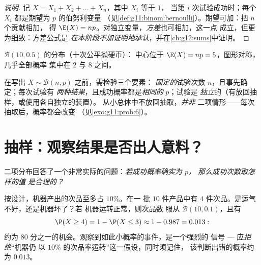 \begin{proof}[说明]
记 $X = X_1 + X_2 + \dots + X_n$，其中 $X_i$ 等于 $1$，
当第 $i$ 次试验成功时；每个 $X_i$ 都是期望为 $p$ 的伯努利变量
（见\cref{def:g11:binom:bernoulli}）。期望可加：把 $n$ 个贡献相加，
得 $\E(X) = np$。对独立变量，\emph{方差}也可相加，这一点
成立，但更为细致：方差公式是
\emph{在本阶段不加证明地承认}，并在\cref{ch:g12:sums}中证明。
\end{proof}

\begin{omfigure}

{\small $\mathcal B(10, 0.5)$ 的分布（十次公平抛硬币）：
中心位于 $\E(X) = np = 5$，图形对称，几乎全部概率
集中在 $2$ 与 $8$ 之间。}
\end{omfigure}

\begin{method}[识别二项情形]\label{met:g11:binom:recognize}
在写出 $X \sim \mathcal B(n, p)$ 之前，需检验三个要素：
\emph{固定的}试验次数 $n$，且事先确定；每次试验有
\emph{两种结果}，且成功概率都是\emph{相同的} $p$；试验是
\emph{独立}的（有放回抽样，或使用各自独立的装置）。
从小总体中不放回抽取，\emph{并非}
二项情形——每次抽取后，概率都会改变
（见\cref{exo:g11:prob:6}）。
\end{method}

\section{抽样：观察结果是否出人意料？}

二项分布回答了一个非常实际的问题：\emph{若成功概率确实为 $p$，
那么成功次数取怎样的值
是合理的？}

\begin{example}\label{ex:g11:binom:decision}
按设计，机器产出的次品至多占 $10\%$。在一
批 $10$ 件产品中有 $4$ 件次品。是运气不好，还是机器坏了？若
机器运转正常，则次品数
服从 $\mathcal B(10, 0.1)$，且有
\[
\P(X \geq 4) = 1 - \P(X \leq 3) \approx 1 - 0.987 = 0.013 :
\]
约为 $80$ 分之一的机会。观察到如此小概率的事件，是一个强烈的
信号 --- 应\emph{拒绝}“机器仍
以 $10\%$ 的次品率运转”这一假设，同时须记住，
该判断出错的概率约为 $0.013$。
\end{example}

